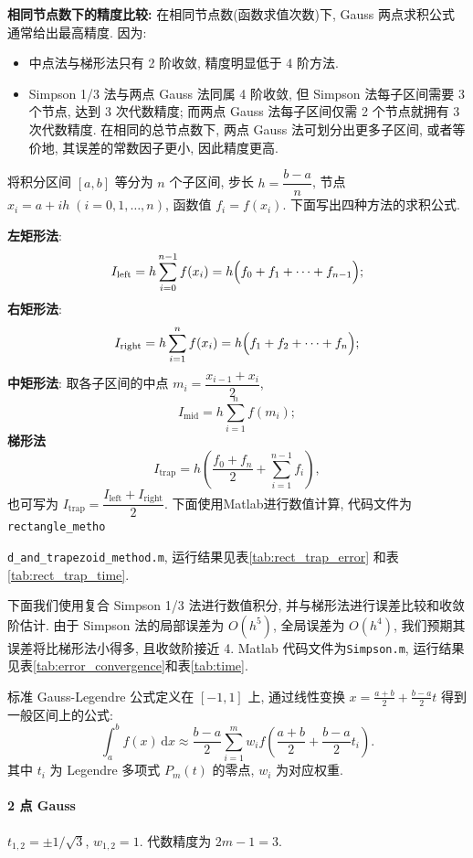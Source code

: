 \documentclass[zihao=-4,a4paper]{ctexart}
\begin{document}
\textbf{相同节点数下的精度比较: }  
在相同节点数(函数求值次数)下, Gauss 两点求积公式通常给出最高精度. 因为: 
\begin{itemize}
    \item 中点法与梯形法只有 2 阶收敛, 精度明显低于 4 阶方法. 
    \item Simpson 1/3 法与两点 Gauss 法同属 4 阶收敛, 但 Simpson 法每子区间需要 3 个节点, 达到 3 次代数精度; 而两点 Gauss 法每子区间仅需 2 个节点就拥有 3 次代数精度. 在相同的总节点数下, 两点 Gauss 法可划分出更多子区间, 或者等价地, 其误差的常数因子更小, 因此精度更高. 
\end{itemize}



将积分区间 $[a, b]$ 等分为 $n$ 个子区间, 步长 $h = \dfrac{b-a}{n}$, 节点 $x_i = a + i h \;(i=0,1,\dots,n)$, 函数值 $f_i = f(x_i)$. 下面写出四种方法的求积公式.

\textbf{左矩形法}:
\[
I_{\text{left}} = h \sum_{i=0}^{n-1} f(x_i) = h\Bigl( f_0 + f_1 + \cdots + f_{n-1} \Bigr);
\]
\textbf{右矩形法}:
\[
I_{\text{right}} = h \sum_{i=1}^{n} f(x_i) = h\Bigl( f_1 + f_2 + \cdots + f_n \Bigr);
\]
\textbf{中矩形法}: 取各子区间的中点 $m_i = \dfrac{x_{i-1} + x_i}{2}$, 
\[
I_{\text{mid}} = h \sum_{i=1}^{n} f(m_i);
\]
\textbf{梯形法}
\[
I_{\text{trap}} = h\left( \frac{f_0 + f_n}{2} + \sum_{i=1}^{n-1} f_i \right),
\]
也可写为 $I_{\text{trap}} = \dfrac{I_{\text{left}} + I_{\text{right}}}{2}$. 下面使用Matlab进行数值计算, 代码文件为\verb|rectangle_metho|

\noindent \verb|d_and_trapezoid_method.m|, 运行结果见表\ref{tab:rect_trap_error} 和表\ref{tab:rect_trap_time}.


下面我们使用复合 Simpson 1/3 法进行数值积分, 并与梯形法进行误差比较和收敛阶估计. 由于 Simpson 法的局部误差为 $O(h^5)$, 全局误差为 $O(h^4)$, 我们预期其误差将比梯形法小得多, 且收敛阶接近 4. Matlab 代码文件为\verb|Simpson.m|, 运行结果见表\ref{tab:error_convergence}和表\ref{tab:time}.


标准 Gauss-Legendre 公式定义在 $[-1,1]$ 上, 通过线性变换 $x = \frac{a+b}{2} + \frac{b-a}{2}t$ 得到一般区间上的公式: 
\[
\int_a^b f(x)\,\mathrm{d}x \approx \frac{b-a}{2}\sum_{i=1}^{m} w_i f\!\left( \frac{a+b}{2} + \frac{b-a}{2}t_i \right).
\]
其中 $t_i$ 为 Legendre 多项式 $P_m(t)$ 的零点, $w_i$ 为对应权重. 
\paragraph{2 点 Gauss}
$t_{1,2} = \pm 1/\sqrt{3}$, $w_{1,2}=1$. 代数精度为 $2m-1=3$. 
\end{document}
